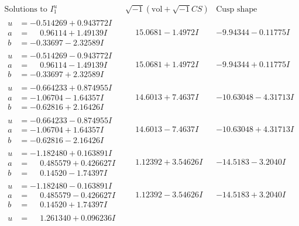 \documentclass[1p]{elsarticle_modified}
\theoremstyle{definition}
\newcommand{\I}{\sqrt{-1}}
\begin{document}
$$\begin{array}{c|c|c}  
\text{Solutions to }I^u_{1}& \I (\text{vol} + \sqrt{-1}CS) & \text{Cusp shape}\\
 \hline 
\begin{aligned}
u &= -0.514269 + 0.943772 I \\
a &= \phantom{-}0.96114 + 1.49139 I \\
b &= -0.33697 - 2.32589 I\end{aligned}
 & \phantom{-}15.0681 - 1.4972 I & -9.94344 - 0.11775 I \\ \hline\begin{aligned}
u &= -0.514269 - 0.943772 I \\
a &= \phantom{-}0.96114 - 1.49139 I \\
b &= -0.33697 + 2.32589 I\end{aligned}
 & \phantom{-}15.0681 + 1.4972 I & -9.94344 + 0.11775 I \\ \hline\begin{aligned}
u &= -0.664233 + 0.874955 I \\
a &= -1.06704 - 1.64357 I \\
b &= -0.62816 + 2.16426 I\end{aligned}
 & \phantom{-}14.6013 + 7.4637 I & -10.63048 - 4.31713 I \\ \hline\begin{aligned}
u &= -0.664233 - 0.874955 I \\
a &= -1.06704 + 1.64357 I \\
b &= -0.62816 - 2.16426 I\end{aligned}
 & \phantom{-}14.6013 - 7.4637 I & -10.63048 + 4.31713 I \\ \hline\begin{aligned}
u &= -1.182480 + 0.163891 I \\
a &= \phantom{-}0.485579 + 0.426627 I \\
b &= \phantom{-}0.14520 - 1.74397 I\end{aligned}
 & \phantom{-}1.12392 + 3.54626 I & -14.5183 - 3.2040 I \\ \hline\begin{aligned}
u &= -1.182480 - 0.163891 I \\
a &= \phantom{-}0.485579 - 0.426627 I \\
b &= \phantom{-}0.14520 + 1.74397 I\end{aligned}
 & \phantom{-}1.12392 - 3.54626 I & -14.5183 + 3.2040 I \\ \hline\begin{aligned}
u &= \phantom{-}1.261340 + 0.096236 I \\

\end{aligned}
\end{array}$$
\end{document}
